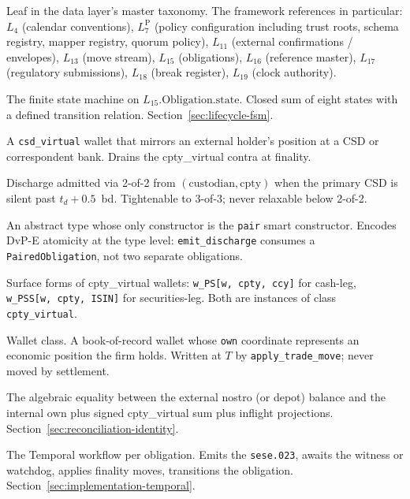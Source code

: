 \documentclass[11pt,a4paper]{article}
\begin{document}
\begin{description}[style=nextline,leftmargin=1.5em]
\item[$L_n$] Leaf in the data layer's master taxonomy. The framework references in particular: $L_4$ (calendar conventions), $L_7^{\mathrm{P}}$ (policy configuration including trust roots, schema registry, mapper registry, quorum policy), $L_{11}$ (external confirmations / envelopes), $L_{13}$ (move stream), $L_{15}$ (obligations), $L_{16}$ (reference master), $L_{17}$ (regulatory submissions), $L_{18}$ (break register), $L_{19}$ (clock authority).

\item[Lifecycle FSM] The finite state machine on $L_{15}.\mathrm{Obligation}.\mathrm{state}$. Closed sum of eight states with a defined transition relation. Section~\ref{sec:lifecycle-fsm}.

\item[Mirror wallet] A \texttt{csd\_virtual} wallet that mirrors an external holder's position at a CSD or correspondent bank. Drains the cpty\_virtual contra at finality.

\item[Multi-source quorum] Discharge admitted via 2-of-2 from $(\mathrm{custodian}, \mathrm{cpty})$ when the primary CSD is silent past $t_d + 0.5$~bd. Tightenable to 3-of-3; never relaxable below 2-of-2.

\item[\texttt{PairedObligation}] An abstract type whose only constructor is the \texttt{pair} smart constructor. Encodes DvP-E atomicity at the type level: \texttt{emit\_discharge} consumes a \texttt{PairedObligation}, not two separate obligations.

\item[\texttt{PS} / \texttt{PSS}] Surface forms of cpty\_virtual wallets: \texttt{w\_PS[w, cpty, ccy]} for cash-leg, \texttt{w\_PSS[w, cpty, ISIN]} for securities-leg. Both are instances of class \texttt{cpty\_virtual}.

\item[\texttt{real}] Wallet class. A book-of-record wallet whose \texttt{own} coordinate represents an economic position the firm holds. Written at $T$ by \texttt{apply\_trade\_move}; never moved by settlement.

\item[Recon identity] The algebraic equality between the external nostro (or depot) balance and the internal $\mathrm{own}$ plus signed cpty\_virtual sum plus inflight projections. Section~\ref{sec:reconciliation-identity}.

\item[\texttt{SettlementSaga}] The Temporal workflow per obligation. Emits the \texttt{sese.023}, awaits the witness or watchdog, applies finality moves, transitions the obligation. Section~\ref{sec:implementation-temporal}.


\end{description}
\end{document}
